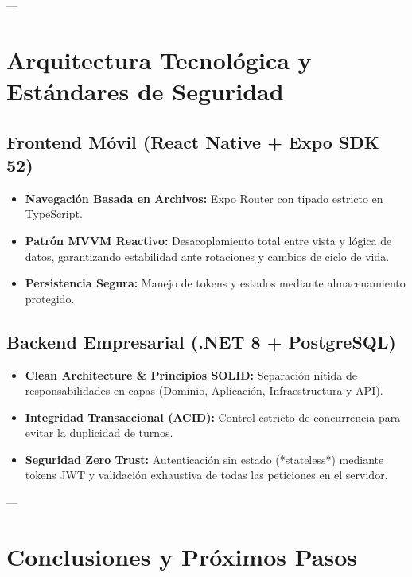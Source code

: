 \documentclass[11pt,a4paper]{article}
\begin{document}
---

\section{Arquitectura Tecnológica y Estándares de Seguridad}

\subsection{Frontend Móvil (React Native + Expo SDK 52)}
\begin{itemize}
    \item \textbf{Navegación Basada en Archivos:} Expo Router con tipado estricto en TypeScript.
    \item \textbf{Patrón MVVM Reactivo:} Desacoplamiento total entre vista y lógica de datos, garantizando estabilidad ante rotaciones y cambios de ciclo de vida.
    \item \textbf{Persistencia Segura:} Manejo de tokens y estados mediante almacenamiento protegido.
\end{itemize}

\subsection{Backend Empresarial (.NET 8 + PostgreSQL)}
\begin{itemize}
    \item \textbf{Clean Architecture \& Principios SOLID:} Separación nítida de responsabilidades en capas (Dominio, Aplicación, Infraestructura y API).
    \item \textbf{Integridad Transaccional (ACID):} Control estricto de concurrencia para evitar la duplicidad de turnos.
    \item \textbf{Seguridad Zero Trust:} Autenticación sin estado (*stateless*) mediante tokens JWT y validación exhaustiva de todas las peticiones en el servidor.
\end{itemize}

---

\section{Conclusiones y Próximos Pasos}
\end{document}
